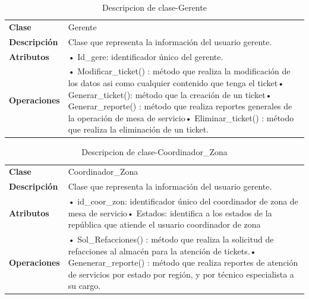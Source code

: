 \begin{table}[htbp]
	\centering
	\caption{Descripcion de clase-Gerente}
	\begin{tabular}{|p{6.145em}|p{28.07em}|}
		\toprule
		\rowcolor[rgb]{ .125,  .216,  .392} \multicolumn{2}{|p{34.215em}|}{\textcolor[rgb]{ 1,  1,  1}{\textbf{Clase Gerente }}} \\
		\midrule
		\textbf{Clase} & \multicolumn{1}{l|}{Gerente } \\
		\midrule
		\textbf{Descripción} & Clase que representa la información del usuario gerente. \\
		\midrule
		\textbf{Atributos } & •	Id\_gere: identificador único del gerente. \\
		\midrule
		\textbf{Operaciones} & •	Modificar\_ticket()  :  método que realiza la modificación de los datos asi como cualquier contenido que tenga el ticket\newline{}•	Generar\_ticket(): método que la creación de un ticket\newline{}•	Generar\_reporte()  : método que realiza reportes generales de la operación de mesa de servicio\newline{}•	Eliminar\_ticket()  : método que realiza la eliminación de un ticket. \\
		\bottomrule
	\end{tabular}%
	\label{tab:clas4}%
\end{table}%


\begin{table}[H]
	\centering
	\caption{Descripcion de clase-Coordinador\_Zona}
	\begin{tabular}{|p{6.145em}|p{28.07em}|}
		\toprule
		\rowcolor[rgb]{ .125,  .216,  .392} \multicolumn{2}{|p{34.215em}|}{\textcolor[rgb]{ 1,  1,  1}{\textbf{Clase Coordinador\_Zona }}} \\
		\midrule
		\textbf{Clase} & \multicolumn{1}{l|}{Coordinador\_Zona} \\
		\midrule
		\textbf{Descripción} & Clase que representa la información del usuario gerente. \\
		\midrule
		\textbf{Atributos } & •	id\_coor\_zon: identificador único del coordinador de zona de mesa de servicio\newline{}•	Estados:  identifica a los estados de la república que atiende el usuario coordinador de zona  \\
		\midrule
		\textbf{Operaciones} & •	Sol\_Refacciones()   :  método que realiza la solicitud de refacciones al almacén para la atención de tickets.\newline{}•	Genenerar\_reporte() : método que realiza reportes de atención de servicios por estado por región, y por técnico especialista a su cargo. \\
		\bottomrule
	\end{tabular}%
	\label{tab:clas5}%
\end{table}%

